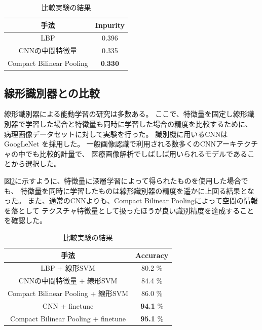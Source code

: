 \begin{table}[h]
  \caption{\label{table:compare_feat}比較実験の結果}
  \center
  \begin{tabular}{c|c} \hline
     手法 & Inpurity \\ \hline
    LBP & 0.396 \\
    CNNの中間特徴量 & 0.335  \\ 
    Compact Bilinear Pooling & $\textbf{0.330}$ \\ \hline
  \end{tabular}
\end{table}

\subsection{線形識別器との比較}
線形識別器による能動学習の研究は多数ある。
ここで、特徴量を固定し線形識別器で学習した場合と特徴量も同時に学習した場合の精度を比較するために、
病理画像データセットに対して実験を行った。
識別機に用いるCNNはGoogLeNet \cite{szegedy2015going}を採用した。
一般画像認識で利用される数多くのCNNアーキテクチャの中でも比較的計量で、
医療画像解析でしばしば用いられるモデルであることから選択した。

図\ref{table:compare_classifier}に示すように、特徴量に深層学習によって得られたものを使用した場合でも、
特徴量を同時に学習したものは線形識別器の精度を遥かに上回る結果となった。
また、通常のCNNよりも、Compact Bilinear Poolingによって空間の情報を落として
テクスチャ特徴量として扱ったほうが良い識別精度を達成することを確認した。

\begin{table}[h]
  \caption{\label{table:compare_classifier}比較実験の結果}
  \center
  \begin{tabular}{c|c} \hline
    手法 & Accuracy  \\ \hline
    LBP + 線形SVM & 80.2 $\%$ \\
    CNNの中間特徴量 + 線形SVM & 84.4 $\%$  \\ 
    Compact Bilinear Pooling + 線形SVM & 86.0 $\%$ \\ \hline
    CNN + finetune & \textbf{94.1} $\%$  \\ 
    Compact Bilinear Pooling + finetune & \textbf{95.1} $\%$ \\ \hline
  \end{tabular}
\end{table}


